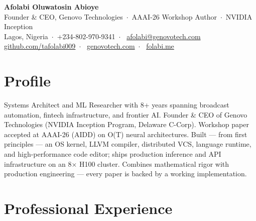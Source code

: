\documentclass[10pt,a4paper]{article}
\newcommand{\sep}{\ $\cdot$\ }
\begin{document}
\begin{center}
  {\Huge\bfseries Afolabi Oluwatosin Abioye}\\[3pt]
  {\color{accent}\large Founder \& CEO, Genovo Technologies\sep AAAI-26 Workshop Author\sep NVIDIA Inception}\\[4pt]
  {\small
    Lagos, Nigeria\sep +234-802-970-9341\sep
    \href{mailto:afolabi@genovotech.com}{afolabi@genovotech.com}\\
    \href{https://github.com/tafolabi009}{github.com/tafolabi009}\sep
    \href{https://genovotech.com}{genovotech.com}\sep
    \href{https://folabi.me}{folabi.me}
  }
\end{center}
\vspace{2pt}

\section{Profile}
Systems Architect and ML Researcher with 8+ years spanning broadcast automation, fintech
infrastructure, and frontier AI. Founder \& CEO of Genovo Technologies (NVIDIA Inception
Program, Delaware C-Corp). Workshop paper accepted at AAAI-26 (AIDD) on O(T) neural
architectures. Built --- from first principles --- an OS kernel, LLVM compiler, distributed VCS,
language runtime, and high-performance code editor; ships production inference and API
infrastructure on an 8$\times$ H100 cluster. Combines mathematical rigor with production
engineering --- every paper is backed by a working implementation.

\section{Professional Experience}
\end{document}
